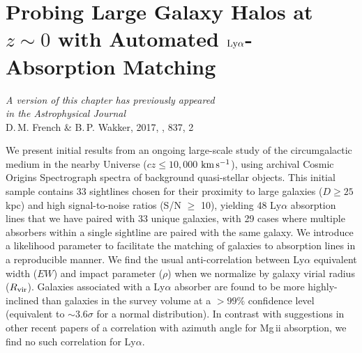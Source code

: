 \chapter[Probing Large Galaxy Halos]{Probing Large Galaxy Halos at $z\sim0$ with Automated $\rm L \MakeLowercase{y} \alpha$-Absorption Matching} 
\label{chap:chap3}


\vfill


\begin{flushright}
    \fixspacing %
    \textit{A version of this chapter has previously appeared\\
        in the \emph{Astrophysical Journal}} \\ \vspace{1ex}
     D.\,M. French \& B.\,P. Wakker, 2017, \apj, 837, 2
\end{flushright}

\vspace*{1in} %

\cleardoublepage


\begin{chabstract}

We present initial results from an ongoing large-scale study of the circumgalactic medium in the nearby Universe ($cz \leq 10,000$ $\rm km\, s^{-1}$), using archival Cosmic Origins Spectrograph spectra of background quasi-stellar objects. This initial sample contains 33 sightlines chosen for their proximity to large galaxies ($D\geq25$ kpc) and high signal-to-noise ratios (S/N $\geq$ 10), yielding 48 Ly$\alpha$ absorption lines that we have paired with 33 unique galaxies, with 29 cases where multiple absorbers within a single sightline are paired with the same galaxy. We introduce a likelihood parameter to facilitate the matching of galaxies to absorption lines in a reproducible manner. We find the usual anti-correlation between Ly$\alpha$ equivalent width ($EW$) and impact parameter ($\rho$) when we normalize by galaxy virial radius ($R_{\rm vir}$). Galaxies associated with a Ly$\alpha$ absorber are found to be more highly-inclined than galaxies in the survey volume at a $>99\%$ confidence level (equivalent to $\sim 3.6 \sigma$ for a normal distribution). In contrast with suggestions in other recent papers of a correlation with azimuth angle for Mg\,{\sc ii} absorption, we find no such correlation for Ly$\alpha$.

\end{chabstract}


